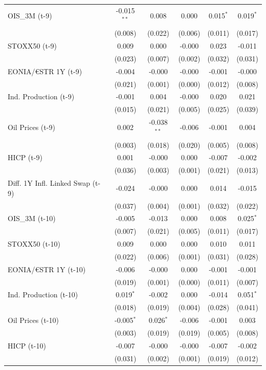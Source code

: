 \begin{longtable}[t]{lccccc}
OIS\_3M (t-9) & -0.015$^{**}$ & 0.008 & 0.000 & 0.015$^{*}$ & 0.019$^{*}$\\
 & (0.008) & (0.022) & (0.006) & (0.011) & (0.017)\\
STOXX50 (t-9) & 0.009 & 0.000 & -0.000 & 0.023 & -0.011\\
 & (0.023) & (0.007) & (0.002) & (0.032) & (0.031)\\
EONIA/€STR 1Y (t-9) & -0.004 & -0.000 & -0.000 & -0.001 & -0.000\\
 & (0.021) & (0.001) & (0.000) & (0.012) & (0.008)\\
Ind. Production (t-9) & -0.001 & 0.004 & -0.000 & 0.020 & 0.021\\
 & (0.015) & (0.021) & (0.005) & (0.025) & (0.039)\\
Oil Prices (t-9) & 0.002 & -0.038$^{**}$ & -0.006 & -0.001 & 0.004\\
 & (0.003) & (0.018) & (0.020) & (0.005) & (0.008)\\
HICP (t-9) & 0.001 & -0.000 & 0.000 & -0.007 & -0.002\\
 & (0.036) & (0.003) & (0.001) & (0.021) & (0.013)\\
Diff. 1Y Infl. Linked Swap (t-9) & -0.024 & -0.000 & 0.000 & 0.014 & -0.015\\
 & (0.037) & (0.004) & (0.001) & (0.032) & (0.022)\\
OIS\_3M (t-10) & -0.005 & -0.013 & 0.000 & 0.008 & 0.025$^{*}$\\
 & (0.007) & (0.021) & (0.005) & (0.011) & (0.017)\\
STOXX50 (t-10) & 0.009 & 0.000 & 0.000 & 0.010 & 0.011\\
 & (0.022) & (0.006) & (0.001) & (0.031) & (0.028)\\
EONIA/€STR 1Y (t-10) & -0.006 & -0.000 & 0.000 & -0.001 & -0.001\\
 & (0.019) & (0.001) & (0.000) & (0.011) & (0.007)\\
Ind. Production (t-10) & 0.019$^{*}$ & -0.002 & 0.000 & -0.014 & 0.051$^{*}$\\
 & (0.018) & (0.019) & (0.004) & (0.028) & (0.041)\\
Oil Prices (t-10) & -0.005$^{*}$ & 0.026$^{*}$ & -0.006 & -0.001 & 0.003\\
 & (0.003) & (0.019) & (0.019) & (0.005) & (0.008)\\
HICP (t-10) & -0.007 & -0.000 & -0.000 & -0.007 & -0.002\\
 & (0.031) & (0.002) & (0.001) & (0.019) & (0.012)\\

\end{longtable}
